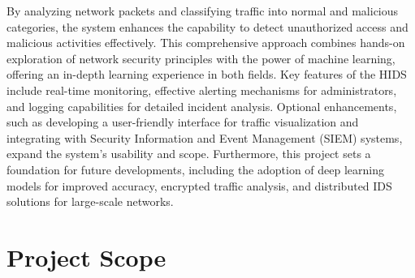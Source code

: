 \documentclass[oneside, english]{reports/assets/sdqtechreport}
\begin{document}
By analyzing network packets and classifying traffic into normal and malicious categories, the system enhances the capability to detect unauthorized access and malicious activities effectively. This comprehensive approach combines hands-on exploration of network security principles with the power of machine learning, offering an in-depth learning experience in both fields.
Key features of the HIDS include real-time monitoring, effective alerting mechanisms for administrators, and logging capabilities for detailed incident analysis. Optional enhancements, such as developing a user-friendly interface for traffic visualization and integrating with Security Information and Event Management (SIEM) systems, expand the system's usability and scope.
Furthermore, this project sets a foundation for future developments, including the adoption of deep learning models for improved accuracy, encrypted traffic analysis, and distributed IDS solutions for large-scale networks.

\chapter{Project Scope}
\label{chap:ProjectScope}
\end{document}

